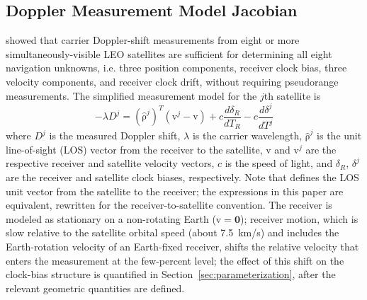 \documentclass[letterpaper,times]{IONconf-v2}
\theoremstyle{plain}
\theoremstyle{remark}
\renewcommand{\vec}[1]{{\boldsymbol{\mathrm{#1}}}}
\begin{document}
\subsection{Doppler Measurement Model Jacobian}\label{subsec:doppler_model}

\textcite{Psiaki2021} showed that carrier Doppler-shift measurements from eight or more simultaneously-visible LEO satellites are sufficient for determining all eight navigation unknowns, i.e. three position components, receiver clock bias, three velocity components, and receiver clock drift, without requiring pseudorange measurements. The simplified measurement model for the $j$th satellite is
%
\begin{equation}\label{eq:simplified_doppler}
    -\lambda D^j = (\hat{\vec\rho}^j)^T (\vec{v}^j - \vec{v}) + c\frac{d\delta_R}{dT_R} - c\frac{d\delta^j}{dT^j}
\end{equation}
%
where $D^j$ is the measured Doppler shift, $\lambda$ is the carrier wavelength, $\hat{\vec\rho}^j$ is the unit line-of-sight (LOS) vector from the receiver to the satellite, $\vec{v}$ and $\vec{v}^j$ are the respective receiver and satellite velocity vectors, $c$ is the speed of light, and $\delta_R$, $\delta^j$ are the receiver and satellite clock biases, respectively. Note that \textcite{Psiaki2021} defines the LOS unit vector from the satellite to the receiver; the expressions in this paper are equivalent, rewritten for the receiver-to-satellite convention. The receiver is modeled as stationary on a non-rotating Earth ($\vec{v} = \mathbf{0}$); receiver motion, which is slow relative to the satellite orbital speed (about 7.5~km/s) and includes the Earth-rotation velocity of an Earth-fixed receiver, shifts the relative velocity that enters the measurement at the few-percent level; the effect of this shift on the clock-bias structure is quantified in Section~\ref{sec:parameterization}, after the relevant geometric quantities are defined. 
\end{document}
